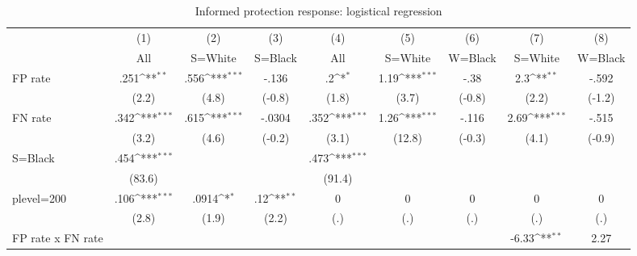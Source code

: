 \begin{table}[htbp]\centering
\def\sym#1{\ifmmode^{#1}\else\(^{#1}\)\fi}
\caption{Informed protection response: logistical regression}
\begin{tabular}{l*{8}{c}}
\hline\hline
                &\multicolumn{1}{c}{(1)}&\multicolumn{1}{c}{(2)}&\multicolumn{1}{c}{(3)}&\multicolumn{1}{c}{(4)}&\multicolumn{1}{c}{(5)}&\multicolumn{1}{c}{(6)}&\multicolumn{1}{c}{(7)}&\multicolumn{1}{c}{(8)}\\
                &\multicolumn{1}{c}{All}&\multicolumn{1}{c}{S=White}&\multicolumn{1}{c}{S=Black}&\multicolumn{1}{c}{All}&\multicolumn{1}{c}{S=White}&\multicolumn{1}{c}{W=Black}&\multicolumn{1}{c}{S=White}&\multicolumn{1}{c}{W=Black}\\
\hline
FP rate         &     .251\sym{**} &     .556\sym{***}&    -.136         &       .2\sym{*}  &     1.19\sym{***}&     -.38         &      2.3\sym{**} &    -.592         \\
                &    (2.2)         &    (4.8)         &   (-0.8)         &    (1.8)         &    (3.7)         &   (-0.8)         &    (2.2)         &   (-1.2)         \\
FN rate         &     .342\sym{***}&     .615\sym{***}&   -.0304         &     .352\sym{***}&     1.26\sym{***}&    -.116         &     2.69\sym{***}&    -.515         \\
                &    (3.2)         &    (4.6)         &   (-0.2)         &    (3.1)         &   (12.8)         &   (-0.3)         &    (4.1)         &   (-0.9)         \\
S=Black         &     .454\sym{***}&                  &                  &     .473\sym{***}&                  &                  &                  &                  \\
                &   (83.6)         &                  &                  &   (91.4)         &                  &                  &                  &                  \\
plevel=200      &     .106\sym{***}&    .0914\sym{*}  &      .12\sym{**} &        0         &        0         &        0         &        0         &        0         \\
                &    (2.8)         &    (1.9)         &    (2.2)         &      (.)         &      (.)         &      (.)         &      (.)         &      (.)         \\
FP rate x FN rate&                  &                  &                  &                  &                  &                  &    -6.33\sym{**} &     2.27         \\

\end{tabular}
\end{table}

